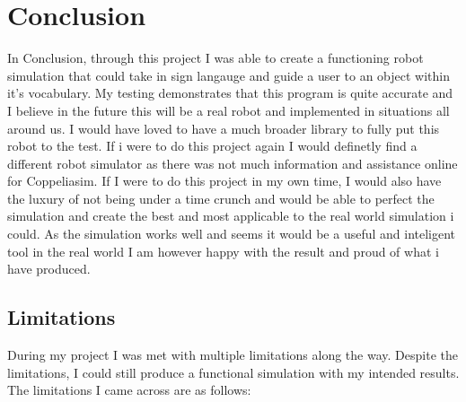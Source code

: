 \documentclass[lettersize,journal]{IEEEtran}
\begin{document}
\section{Conclusion}

In Conclusion, through this project I was able to create a functioning robot simulation that could take in sign langauge and guide a user to an object within it's vocabulary. My testing demonstrates that this program is quite accurate and I believe in the future this will be a real robot and implemented in situations all around us. I would have loved to have a much broader library to fully put this robot to the test. If i were to do this project again I would definetly find a different robot simulator as there was not much information and assistance online for Coppeliasim. If I were to do this project in my own time, I would also have the luxury of not being under  a time crunch and would be able to perfect the simulation and create the best and most applicable to the real world simulation i could. As the simulation works well and seems it would be a useful and inteligent tool in the real world I am however happy with the result and proud of what i have produced.

\subsection{Limitations}

During my project I was met with multiple limitations along the way. Despite the limitations, I could still produce a functional simulation with my intended results. The limitations I came across are as follows:
\end{document}
